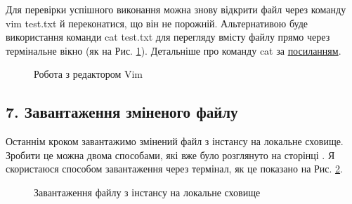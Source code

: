 \documentclass[a4paper,14pt]{extarticle}
\begin{document}
Для перевірки успішного виконання можна знову відкрити файл через команду 
{\ttfamily vim test.txt} й переконатися, що він не порожній. Альтернативою
буде використання команди {\ttfamily cat test.txt} для перегляду вмісту файлу 
прямо через термінальне вікно (як на Рис. \ref{fig:vim}). Детальніше про команду 
{\ttfamily cat} за 
\href{https://askubuntu.com/questions/642942/what-is-cat-used-for}{посиланням}.

\begin{figure}[H]
    \begin{minipage}[H]{1\linewidth}
    \end{minipage}
    \vfill
    \begin{minipage}[H]{1\linewidth}
        \caption{Робота з редактором Vim}
        \label{fig:vim}
    \end{minipage}
\end{figure}

\subsection*{7. Завантаження зміненого файлу}

Останнім кроком завантажимо змінений файл з інстансу на локальне сховище.
Зробити це можна двома способами, які вже було розглянуто на 
сторінці \pageref{section:5}. Я скористаюся способом завантаження 
через термінал, як це показано на Рис. \ref{fig:upload}.

\begin{figure}[H]
    \caption{Завантаження файлу з інстансу на локальне сховище}
    \label{fig:upload}
\end{figure}
\end{document}
